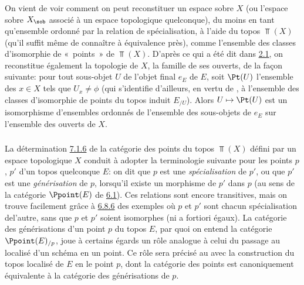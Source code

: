 \subsubsection{}
On vient de voir comment on peut reconstituer un espace sobre $X$
(ou l'espace sobre $X_{\sob}$ associé à un espace topologique
quelconque), du moins en tant qu'ensemble ordonné par la relation de
spécialisation, à l'aide du topos $\Top(X)$ (qu'il suffit même de
connaître à équivalence près), comme l'ensemble des classes
d'isomorphie de « points »  de $\Top(X)$. D'après ce qui a été
dit dans \hyperref[IV.subsec2.1]{2.1}, on reconstitue également la topologie
de $X$, \ie la famille de ses ouverts, de la façon suivante: pour
tout sous-objet $U$ de l'objet final $e_E$ de $E$, soit $\Pt(U)$
l'ensemble des $x\in X$ tels que $U_x\neq\phi$ (qui s'identifie
d'ailleurs, en vertu de , à l'ensemble des classes
d'isomorphie de points du topos induit $E_{/U}$). Alors $U\mapsto
\Pt(U)$ est un isomorphisme d'ensembles ordonnés de l'ensemble des
sous-objets de $e_E$ sur l'ensemble des ouverts de $X$.

\subsubsection{}
La détermination \hyperref[IV.subsubsec7.1.6]{7.1.6} de la catégorie des points
du topos $\Top(X)$ défini par un espace topologique $X$ conduit à
adopter la terminologie suivante pour les points $p$, $p'$ d'un
topos quelconque $E$: on dit que $p$ est une \emph{spécialisation}
de $p'$, ou que $p'$ est une \emph{générisation} de $p$, lorsqu'il
existe un morphisme de $p'$ dans $p$ (au sens de la catégorie
$\Ppoint(E)$ de \hyperref[IV.def6.1]{6.1}). Ces relations sont encore
transitives, mais on trouve facilement grâce à
\hyperref[IV.subsubsec6.8.6]{6.8.6} des exemples où $p$ et $p'$ sont chacun
spécialisation de\pageoriginale l'autre, sans que $p$ et $p'$ soient
isomorphes (ni a fortiori égaux). La catégorie des
générisations
d'un point $p$ du topos $E$, par quoi on entend la catégorie
$\Ppoint(E)_{/p}$, joue à certains égards un rôle analogue à celui
du passage au localisé d'un schéma en un point. Ce rôle sera
précisé
au  avec la construction du topos localisé de $E$ en le
point $p$, dont la catégorie des points est canoniquement
équivalente à la catégorie des générisations de $p$.


